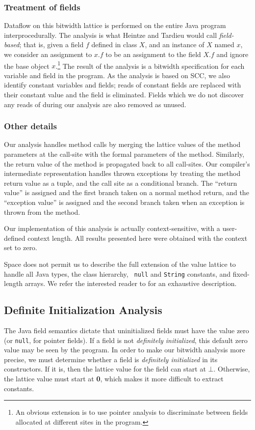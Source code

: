 \documentclass[preprint]{acmconf}
\begin{document}
\subsubsection{Treatment of fields}
Dataflow on this bitwidth lattice is performed on the entire Java
program interprocedurally.  The analysis is what Heintze and Tardieu
\cite{heintze01}
would call {\it field-based}; that is, given a field $f$ defined in
class $X$, and an instance of $X$ named $x$, we consider an assignment
to $x.f$ to be an assignment to the field $X.f$ and ignore the base
object $x$.\footnote{An obvious extension is to use pointer
analysis to discriminate between fields allocated at different sites
in the program.}  The result of the analysis is a bitwidth
specification for each variable and field in the program.  As the
analysis is based on SCC, we also identify constant variables and
fields; reads of constant fields are replaced with their constant
value and the field is eliminated.  Fields which we do not discover
any reads of during our analysis are also removed as unused.

\subsubsection{Other details}
Our analysis handles method calls by merging the lattice values of the
method parameters at the call-site with the formal parameters of the
method.  Similarly, the return value of the method is propagated back
to all call-sites.  Our compiler's intermediate representation handles
thrown exceptions by treating the method return value as a tuple, and
the call site as a conditional branch.  The ``return value'' is
assigned and the first branch taken on a normal method return, and the
``exception value'' is assigned and the second branch taken when an
exception is thrown from the method.

Our implementation of this analysis is actually context-sensitive,
with a user-defined context length.  All results presented here were
obtained with the context set to zero.

Space does not permit us to describe the full extension of the value
lattice to handle all Java types, the class hierarchy, {\tt
  null} and {\tt String} constants, and fixed-length arrays.
We refer the interested reader to \cite{ananian99:tech} for an
exhaustive description.

\subsection{Definite Initialization Analysis}
The Java field semantics dictate that uninitialized fields must have
the value zero (or {\tt null}, for pointer fields).  If a field is not
{\it definitely initialized}, this default zero value may be seen by
the program.  In order to make our bitwidth analysis more precise, we
must determine whether a field is {\it definitely initialized} in its
constructors.  If it is, then the lattice value for the field can
start at $\bot$.  Otherwise, the lattice value must start at
{\bf 0}, which makes it more difficult to extract constants.
\end{document}
